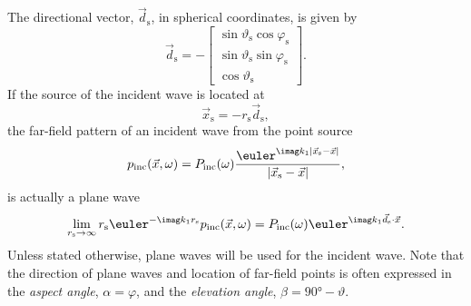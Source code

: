 The directional vector, $\vec{d}_{\mathrm{s}}$, in spherical coordinates, is given by
\begin{equation}
	\vec{d}_{\mathrm{s}} = -\begin{bmatrix}
		\sin\vartheta_{\mathrm{s}}\cos\varphi_{\mathrm{s}}\\
		\sin\vartheta_{\mathrm{s}}\sin\varphi_{\mathrm{s}}\\
		\cos\vartheta_{\mathrm{s}}		
	\end{bmatrix}.
\end{equation}
If the source of the incident wave is located at
\begin{equation}\label{Eq1:x_s}
	\vec{x}_{\mathrm{s}} = -r_{\mathrm{s}}\vec{d}_{\mathrm{s}},
\end{equation}
the far-field pattern of an incident wave from the point source
\begin{equation}
	p_{\mathrm{inc}}(\vec{x},\omega) = P_{\mathrm{inc}}(\omega)\frac{\euler^{\imag k_1 |\vec{x}_{\mathrm{s}}-\vec{x}|}}{|\vec{x}_{\mathrm{s}}-\vec{x}|},
\end{equation}
is actually a plane wave
\begin{equation}
	\lim_{r_{\mathrm{s}}\to\infty} r_{\mathrm{s}}\euler^{-\imag k_1 r_{\mathrm{s}}}p_{\mathrm{inc}}(\vec{x},\omega) = P_{\mathrm{inc}}(\omega)\euler^{\imag k_1\vec{d}_{\mathrm{s}}\cdot\vec{x}}.
\end{equation}
Unless stated otherwise, plane waves will be used for the incident wave. Note that the direction of plane waves and location of far-field points is often expressed in the \textit{aspect angle}, $\alpha=\varphi$, and the \textit{elevation angle}, $\beta=\ang{90}-\vartheta$.

